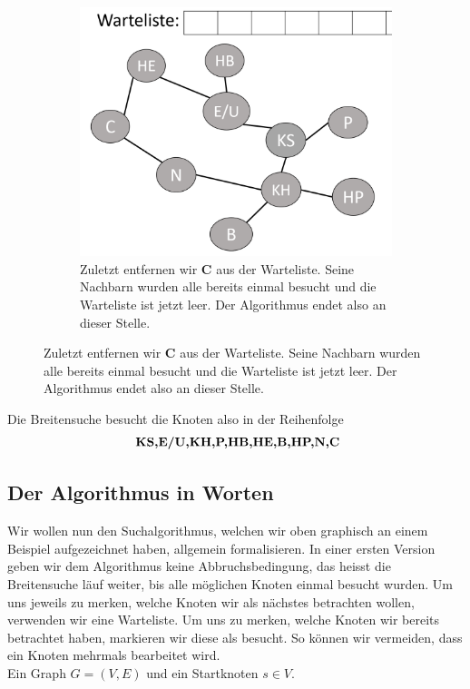 \begin{figure}[H]\ContinuedFloat
     \centering
     \begin{subfigure}[h]{0.45\textwidth}
    \centering
    \includegraphics[width=\textwidth]{Pictures/BS/BFSB10.PNG}
    \caption{Zuletzt entfernen wir {\bf{C}} aus der Warteliste. Seine Nachbarn wurden alle bereits einmal besucht und die Warteliste ist jetzt leer. Der Algorithmus endet also an dieser Stelle.}
    \end{subfigure}
\end{figure}
Die Breitensuche besucht die Knoten also in der Reihenfolge 
$$ \text{ \bf{KS,E/U,KH,P,HB,HE,B,HP,N,C}} $$

\subsection{Der Algorithmus in Worten}
Wir wollen nun den Suchalgorithmus, welchen wir oben graphisch an einem Beispiel aufgezeichnet haben, allgemein formalisieren. In einer ersten Version geben wir dem Algorithmus keine Abbruchsbedingung, das heisst die Breitensuche läuf weiter, bis alle möglichen Knoten einmal besucht wurden. Um uns jeweils zu merken, welche Knoten wir als nächstes betrachten wollen, verwenden wir eine Warteliste. Um uns zu merken, welche Knoten wir bereits betrachtet haben, markieren wir diese als besucht. So können wir vermeiden, dass ein Knoten mehrmals bearbeitet wird.\\

  Ein Graph $G=(V,E)$ und ein Startknoten $s \in V$.

